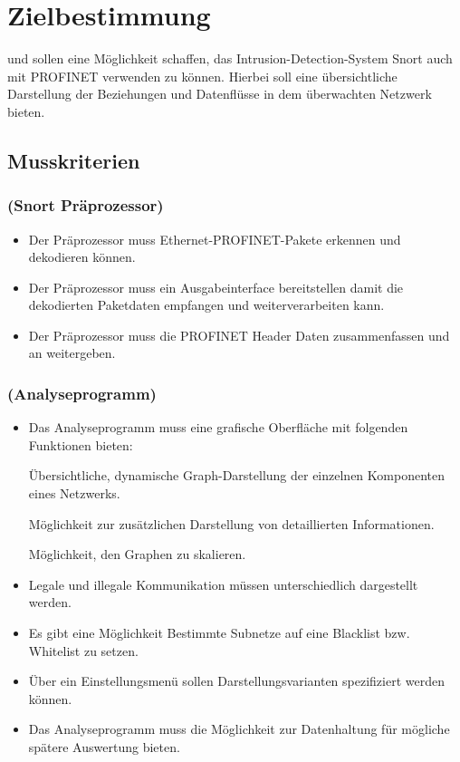 \chapter{Zielbestimmung}

\programname und \sppname sollen eine Möglichkeit schaffen, das Intrusion-Detection-System Snort auch mit PROFINET verwenden zu können.
Hierbei soll \programname eine übersichtliche Darstellung der Beziehungen und Datenflüsse in dem überwachten Netzwerk bieten.

\section{Musskriterien}

\subsection{\sppname (Snort Präprozessor)}

\begin{itemize}
\item Der Präprozessor muss Ethernet-PROFINET-Pakete erkennen und dekodieren können.

\item Der Präprozessor muss ein Ausgabeinterface bereitstellen damit \programname die dekodierten Paketdaten empfangen und weiterverarbeiten kann.

\item Der Präprozessor muss die PROFINET Header Daten zusammenfassen und an \programname weitergeben.
\end{itemize}

\subsection{\programname (Analyseprogramm)}

\begin{itemize}
\item Das Analyseprogramm muss eine grafische Oberfläche mit folgenden Funktionen bieten:

    \subitem Übersichtliche, dynamische Graph-Darstellung der einzelnen Komponenten eines Netzwerks.

    \subitem Möglichkeit zur zusätzlichen Darstellung von detaillierten Informationen.

    \subitem Möglichkeit, den Graphen zu skalieren.

\item Legale und illegale Kommunikation müssen unterschiedlich dargestellt werden.

\item Es gibt eine Möglichkeit Bestimmte Subnetze auf eine Blacklist bzw. Whitelist zu setzen.

\item Über ein Einstellungsmenü sollen Darstellungsvarianten spezifiziert werden können.

\item Das Analyseprogramm muss die Möglichkeit zur Datenhaltung für mögliche spätere Auswertung bieten.
\end{itemize}

